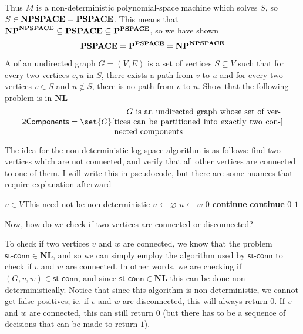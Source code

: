 \documentclass[10pt]{article}
\def\stconn{\textsf{st-conn}}
\def\P{\mathbf{P}}
\def\NP{\mathbf{NP}}
\def\NL{\mathbf{NL}}
\begin{document}
Thus $M$ is a non-deterministic polynomial-space machine which solves $S$, so $S\in\mathbf{NPSPACE}=\mathbf{PSPACE}$.
This means that $\NP^\NPSPACE\subseteq\PSPACE\subseteq\P^\PSPACE$, so we have shown
\[ \PSPACE = \P^\PSPACE = \NP^\NPSPACE \]

\newpage
\def\twocomp{\mathsf{2Components}}
\begin{exercise*}

    A  of an undirected graph $G=(V,E)$ is a set of vertices $S\subseteq V$ such that for every two vertices $v,u$ in $S$, there exists a path from $v$ to $u$ and for every
    two vertices $v\in S$ and $u\notin S$, there is no path from $v$ to $u$.
    Show that the following problem is in $\NL$
    \[ \twocomp = \set{G}[\vcenter{\advance\hsize by-5cm
    $G$ is an undirected graph whose set of vertices can be partitioned into exactly two connected components}] \]

\end{exercise*}

The idea for the non-deterministic log-space algorithm is as follows: find two vertices which are not connected, and verify that all other vertices are connected to one of them.
I will write this in pseudocode, but there are some nuances that require explanation afterward

\algorithm
        \State $v\in V$\lComment This need not be non-deterministic
        \State $u\gets\varnothing$
             $u\gets w$
        \EndFor
         \Return $0$
             \textbf{continue}
             \textbf{continue}
            \State\Return $0$
        \EndFor
        \State\Return $1$
    \EndFunc
\ealgorithm

Now, how do we check if two vertices are connected or disconnected?

\benum
    \item To check if two vertices $v$ and $w$ are connected, we know that the problem $\stconn\in\NL$, and so we can simply employ the algorithm used by $\stconn$ to check if $v$ and $w$ are connected.
    In other words, we are checking if $(G,v,w)\in\stconn$, and since $\stconn\in\NL$ this can be done non-deterministically.
    Notice that since this algorithm is non-deterministic, we cannot get false positives; ie. if $v$ and $w$ are disconnected, this will always return $0$.
    If $v$ and $w$ are connected, this can still return $0$ (but there has to be a sequence of decisions that can be made to return $1$).
\end{document}
